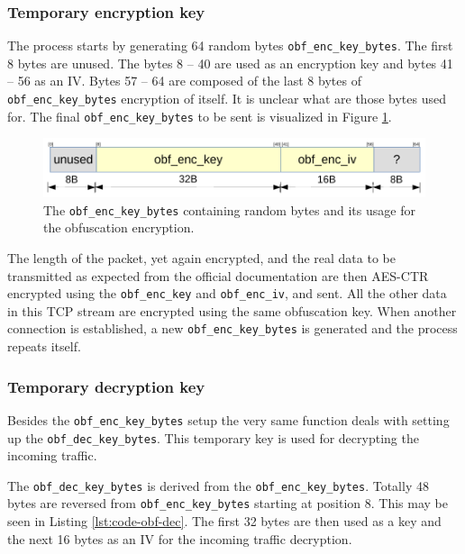 \documentclass[thesis=M,english]{FITthesis}[2012/10/20]
\begin{document}
\subsubsection{Temporary encryption key}\label{code-obf-enc-key}

The process starts by generating 64 random bytes \texttt{obf\_enc\_key\_bytes}. The first 8 bytes are unused. The bytes 8 -- 40 are used as an encryption key and bytes 41 -- 56 as an IV. Bytes 57 -- 64 are composed of the last 8 bytes of \texttt{obf\_enc\_key\_bytes} encryption of itself. It is unclear what are those bytes used for. The final \texttt{obf\_enc\_key\_bytes} to be sent is visualized in Figure \ref{img:code-obfuscation-bytes-sent}.

\begin{figure}[htb]
	\centering
	\includegraphics[width=1\textwidth]{bytes-sent.pdf}
	\caption[Random bytes used for obfuscation]{The \texttt{obf\_enc\_key\_bytes} containing random bytes and its usage for the obfuscation encryption.}
	\label{img:code-obfuscation-bytes-sent}
\end{figure}

The length of the packet, yet again encrypted, and the real data to be transmitted as expected from the official documentation are then AES-CTR encrypted using the \texttt{obf\_enc\_key} and \texttt{obf\_enc\_iv}, and sent. All the other data in this TCP stream are encrypted using the same obfuscation key. When another connection is established, a new \texttt{obf\_enc\_key\_bytes} is generated and the process repeats itself.

\subsubsection{Temporary decryption key}

Besides the \texttt{obf\_enc\_key\_bytes} setup the very same function deals with setting up the \texttt{obf\_dec\_key\_bytes}. This temporary key is used for decrypting the incoming traffic.

The \texttt{obf\_dec\_key\_bytes} is derived from the \texttt{obf\_enc\_key\_bytes}. Totally 48 bytes are reversed from \texttt{obf\_enc\_key\_bytes} starting at position 8. This may be seen in Listing \ref{lst:code-obf-dec}. The first 32 bytes are then used as a key and the next 16 bytes as an IV for the incoming traffic decryption.
\end{document}
